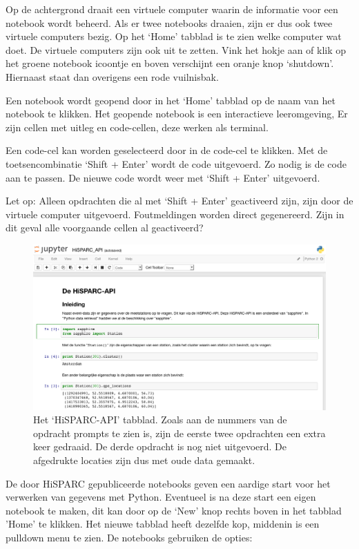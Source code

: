 Op de achtergrond draait een virtuele computer waarin de informatie voor
een notebook wordt beheerd. Als er twee notebooks draaien, zijn er dus ook twee virtuele computers bezig. Op het
`Home' tabblad is te zien welke computer wat doet. De virtuele computers zijn ook uit te zetten. Vink het hokje aan of
klik op het groene notebook icoontje en boven verschijnt een oranje knop `shutdown'. Hiernaast staat dan overigens
een rode vuilnisbak.

Een notebook wordt geopend door in het `Home' tabblad op de naam van het notebook te klikken. Het geopende notebook
is een interactieve leeromgeving, Er zijn cellen met uitleg en code-cellen, deze werken als terminal.

Een code-cel kan worden geselecteerd door in de code-cel te klikken. Met de toetsencombinatie `Shift + Enter' wordt de code uitgevoerd. Zo nodig
is de code aan te passen. De nieuwe code wordt weer met `Shift + Enter' uitgevoerd.

Let op: Alleen opdrachten die al met `Shift + Enter' geactiveerd zijn, zijn door de virtuele computer uitgevoerd. Foutmeldingen
worden direct gegenereerd. Zijn in dit geval alle voorgaande cellen al geactiveerd?

\begin{figure}[H]
\includegraphics[width=16cm]{HiSPARC_API.png}
\caption{Het `HiSPARC-API' tabblad. Zoals aan de nummers van de opdracht prompts te zien is, zijn de eerste twee opdrachten
een extra keer gedraaid. De derde opdracht is nog niet uitgevoerd. De afgedrukte locaties zijn dus met oude data gemaakt.}
\end{figure}

De door HiSPARC gepubliceerde notebooks geven een aardige start voor het verwerken van gegevens met Python.
Eventueel is na deze start een eigen notebook te maken, dit kan door op de `New' knop rechts boven in het tabblad 'Home' te
klikken. Het nieuwe tabblad heeft dezelfde kop, middenin is een pulldown menu te zien. De notebooks gebruiken de opties:

